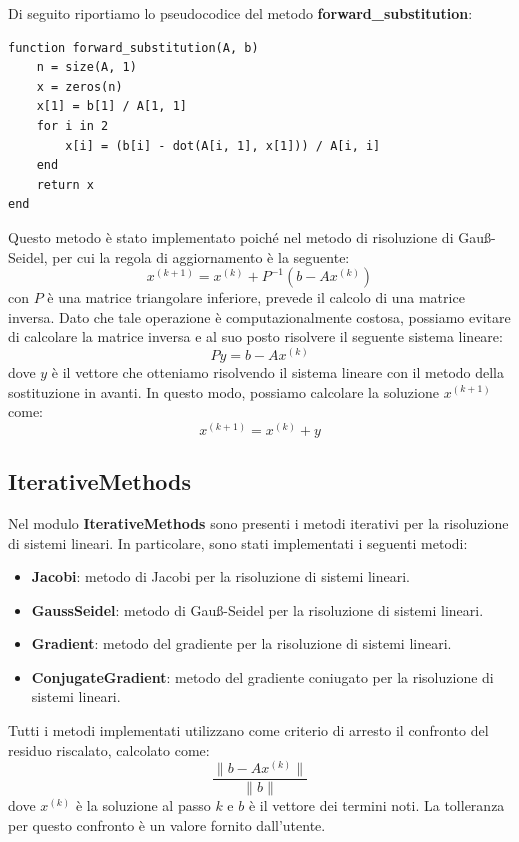 Di seguito riportiamo lo pseudocodice del metodo \textbf{forward\_substitution}:
\begin{verbatim}
function forward_substitution(A, b)
    n = size(A, 1)
    x = zeros(n)
    x[1] = b[1] / A[1, 1]
    for i in 2
        x[i] = (b[i] - dot(A[i, 1], x[1])) / A[i, i]
    end
    return x
end
\end{verbatim}
Questo metodo è stato implementato poiché nel metodo di risoluzione di Gauß-Seidel,
per cui la regola di aggiornamento è la seguente:
\begin{equation}
    x^{(k+1)} = x^{(k)} + P^{-1}(b - Ax^{(k)})
\end{equation}
con $P$ è una matrice triangolare inferiore, prevede il calcolo di una matrice
inversa. Dato che tale operazione è computazionalmente costosa, possiamo evitare
di calcolare la matrice inversa e al suo posto risolvere il seguente sistema
lineare:
\begin{equation}
    Py = b - Ax^{(k)}
\end{equation}
dove $y$ è il vettore che otteniamo risolvendo il sistema lineare con il metodo
della sostituzione in avanti. In questo modo, possiamo calcolare la soluzione
$x^{(k+1)}$ come:
\begin{equation}
    x^{(k+1)} = x^{(k)} + y
\end{equation}
\subsection{IterativeMethods}
Nel modulo \textbf{IterativeMethods} sono presenti i metodi iterativi per la
risoluzione di sistemi lineari. In particolare, sono stati implementati i seguenti
metodi:
\begin{itemize}
    \item \textbf{Jacobi}: metodo di Jacobi per la risoluzione di sistemi lineari.
    \item \textbf{GaussSeidel}: metodo di Gauß-Seidel per la risoluzione di
          sistemi lineari.
    \item \textbf{Gradient}: metodo del gradiente per la risoluzione di sistemi
          lineari.
    \item \textbf{ConjugateGradient}: metodo del gradiente coniugato per la
          risoluzione di sistemi lineari.
\end{itemize}

Tutti i metodi implementati utilizzano come criterio di arresto il confronto del
residuo riscalato, calcolato come:
\begin{equation}
    \frac{\|b - Ax^{(k)}\|}{\|b\|}
\end{equation}
dove $x^{(k)}$ è la soluzione al passo $k$ e $b$ è il vettore dei termini noti.
La tolleranza per questo confronto è un valore fornito dall'utente.

